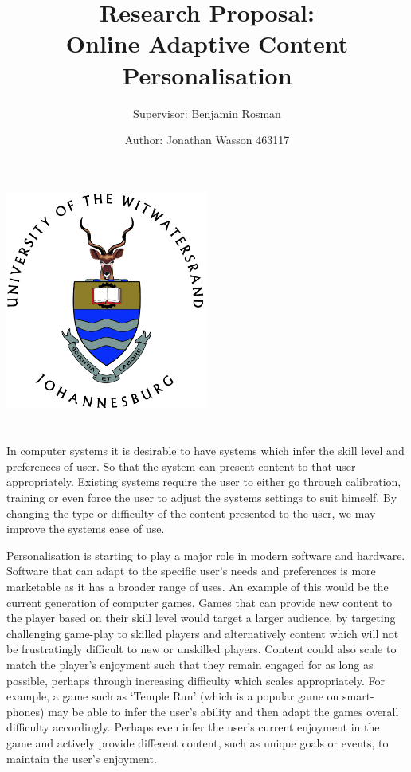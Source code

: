 \documentclass[11pt]{article}
\title{Research Proposal:\\ Online Adaptive Content Personalisation}
\subtitle{Supervisor: Benjamin Rosman}
\author{Author: Jonathan Wasson 463117}
\begin{document}
    
\begin{titlepage}
\maketitle
\thispagestyle{empty}
\setcounter{page}{0}

\begin{center}
    \includegraphics[width=0.5\textwidth]{WITS-logo.jpg}
\end{center}

\clearpage



\section*{}

In computer systems it is desirable to have systems which infer the skill level and preferences of user. So that the system can present content to that user appropriately. Existing systems require the user to either go through calibration, training or even force the user to adjust the systems settings to suit himself. By changing the type or difficulty of the content presented to the user, we may improve the systems ease of use. 
\vspace{6.0 mm}

Personalisation is starting to play a major role in modern software and hardware. Software that can adapt to the specific user's needs and preferences is more marketable as it has a broader range of uses. An example of this would be the current generation of computer games. Games that can provide new content to the player based on their skill level would target a larger audience, by targeting challenging game-play to skilled players and alternatively content which will not be frustratingly difficult to new or unskilled players. Content could also scale to match the player's enjoyment such that they remain engaged for as long as possible, perhaps through increasing difficulty which scales appropriately. 
For example, a game such as `Temple Run' (which is a popular game on smart-phones) may be able to infer the user's ability and then adapt the games overall difficulty accordingly. Perhaps even infer the user's current enjoyment in the game and actively provide different content, such as unique goals or events, to maintain the user's enjoyment.


\end{titlepage}
\end{document}
